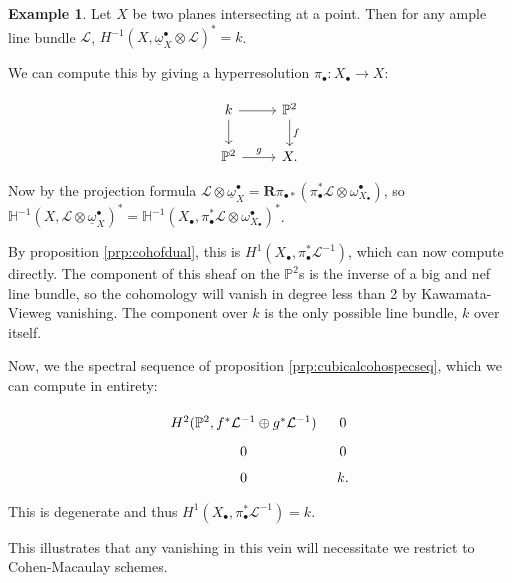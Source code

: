 \documentclass{report}
\theoremstyle{definition}
\newtheorem{example}[theorem]{Example}
\newcommand{\HH}{\mathbb{H}}
\newcommand{\LL}{\mathcal{L}}
\newcommand{\PP}{\mathbb{P}}
\newcommand{\bR}{\textbf{R}}
\newcommand{\db}{\underline{\omega}^\bullet}
\begin{document}
\begin{example}
	Let $X$ be two planes intersecting at a point.
	Then for any ample line bundle $\LL$, $H^{-1}(X,\db_X \otimes \LL)^* = k$.
	
	We can compute this by giving a hyperresolution $\pi_\bullet : X_\bullet \rightarrow X$:
	
	\[\begin{tikzcd}
		k \arrow{r} \arrow{d} & \PP^2 \arrow{d}{f} \\
		\PP^2 \arrow{r}{g} & X.
	\end{tikzcd}\]
	
	Now by the projection formula $\LL \otimes \db_X = \bR \pi_{\bullet *} (\pi_\bullet^* \LL \otimes \omega_{X_\bullet}^\bullet)$, so $\HH^{-1}(X, \LL \otimes \db_X)^* = \HH^{-1}(X_\bullet, \pi_\bullet^* \LL \otimes \omega_{X_\bullet}^\bullet)^*$.
	
	By proposition \ref{prp:cohofdual}, this is $H^1(X_\bullet, \pi_\bullet^* \LL^{-1})$, which can now compute directly.
	The component of this sheaf on the $\PP^2$s is the inverse of a big and nef line bundle, so the cohomology will vanish in degree less than 2 by Kawamata-Vieweg vanishing.
	The component over $k$ is the only possible line bundle, $k$ over itself.
	
	Now, we the spectral sequence of proposition \ref{prp:cubicalcohospecseq}, which we can compute in entirety:
	
	\[\begin{tikzcd}[row sep = tiny, column sep = tiny]
	H^2(\PP^2, f^* \LL^{-1} \oplus g^* \LL^{-1}) & 0 \\
	0 & 0 \\
	0 & k.
	\end{tikzcd}\]
	
	This is degenerate and thus $H^1(X_\bullet, \pi_\bullet^* \LL^{-1}) = k$.
\end{example}

This illustrates that any vanishing in this vein will necessitate we restrict to Cohen-Macaulay schemes.
\end{document}
